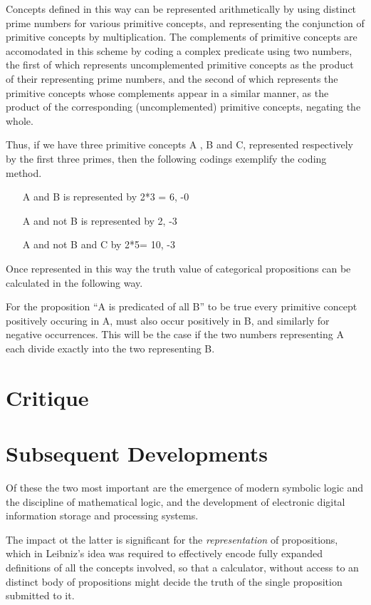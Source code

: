 Concepts defined in this way can be represented arithmetically by using distinct prime numbers for
various primitive concepts, and representing the conjunction of primitive concepts by multiplication.
The complements of primitive concepts are accomodated in this scheme by coding a complex predicate
using two numbers, the first of which represents uncomplemented primitive concepts as the product of
their representing prime numbers, and the second of which represents the primitive concepts whose
complements appear in a similar manner, as the product of the corresponding (uncomplemented) primitive
concepts, negating the whole.

Thus, if we have three primitive concepts A , B and C, represented respectively by
the first three primes, then the following codings exemplify  the coding method.

\begin{itemize}
\item[A and B] is represented by 2*3 = 6, -0
\item[A and not B] is represented by 2, -3
\item[A and not B and C] by 2*5= 10, -3
\end{itemize}

Once represented in this way the truth value of categorical
propositions can be calculated in the following way.

For the proposition ``A is predicated of all B'' to be true every primitive concept
positively occuring in A, must also occur positively in B, and similarly for negative
occurrences.
This will be the case if the two numbers representing A each divide exactly into the two
representing B.

\section{Critique}

\section{Subsequent Developments}

Of these the two most important are the emergence of modern symbolic logic and the discipline of
mathematical logic, and the development of electronic digital information storage and processing
systems.

The impact ot the latter is significant for the \emph{representation} of propositions, which
in Leibniz's idea was required to effectively encode fully expanded definitions of all the
concepts involved, so that a calculator, without access to an distinct body of propositions
might decide the truth of the single proposition submitted to it.


